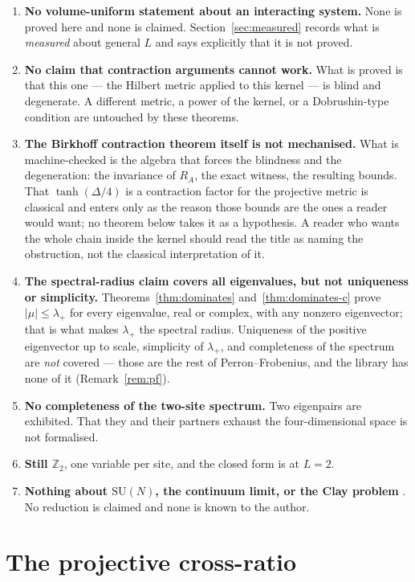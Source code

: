 \documentclass[11pt]{article}
\theoremstyle{definition}
\newcommand{\Z}{\mathbb{Z}}
\newcommand{\SU}{\mathrm{SU}}
\begin{document}
\begin{enumerate}
\item \textbf{No volume-uniform statement about an interacting system.}  None is
proved here and none is claimed.  Section~\ref{sec:measured} records what is
\emph{measured} about general $L$ and says explicitly that it is not proved.
\item \textbf{No claim that contraction arguments cannot work.}  What is proved
is that this one --- the Hilbert metric applied to this kernel --- is blind and
degenerate.  A different metric, a power of the kernel, or a Dobrushin-type
condition are untouched by these theorems.
\item \textbf{The Birkhoff contraction theorem itself is not mechanised.}  What
is machine-checked is the algebra that forces the blindness and the
degeneration: the invariance of $R_A$, the exact witness, the resulting bounds.
That $\tanh(\Delta/4)$ is a contraction factor for the projective metric is
classical \cite{Birkhoff,Bushell} and enters only as the reason those bounds are
the ones a reader would want; no theorem below takes it as a hypothesis.  A
reader who wants the whole chain inside the kernel should read the title as
naming the obstruction, not the classical interpretation of it.
\item \textbf{The spectral-radius claim covers all eigenvalues, but not
uniqueness or simplicity.}  Theorems~\ref{thm:dominates}
and~\ref{thm:dominates-c} prove $|\mu|\le\lambda_+$ for every eigenvalue, real
or complex, with any nonzero eigenvector; that is what makes $\lambda_+$ the
spectral radius.  Uniqueness of the positive eigenvector up to scale,
simplicity of $\lambda_+$, and completeness of the spectrum are \emph{not}
covered --- those are the rest of Perron--Frobenius, and the library has none of
it (Remark~\ref{rem:pf}).
\item \textbf{No completeness of the two-site spectrum.}  Two eigenpairs are
exhibited.  That they and their partners exhaust the four-dimensional space is
not formalised.
\item \textbf{Still $\Z_2$}, one variable per site, and the closed form is at
$L=2$.
\item \textbf{Nothing about $\SU(N)$, the continuum limit, or the Clay problem}
\cite{Clay}.  No reduction is claimed and none is known to the author.
\end{enumerate}

\section{The projective cross-ratio}
\end{document}
